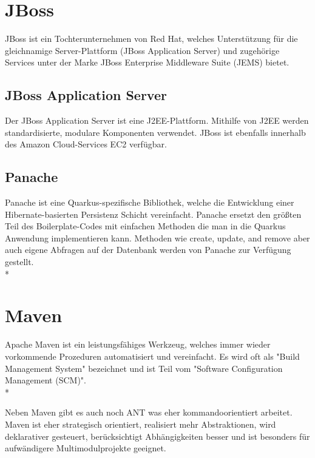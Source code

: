 \section{JBoss}
\author{David Ignjatovic}

JBoss ist ein Tochterunternehmen von Red Hat, welches Unterstützung für die gleichnamige Server-Plattform (JBoss Application Server) 
und zugehörige Services unter der Marke JBoss Enterprise Middleware Suite (JEMS) bietet. \cite{JBoss}

\subsection{JBoss Application Server}

Der JBoss Application Server ist eine J2EE-Plattform. Mithilfe von J2EE werden standardisierte, modulare Komponenten verwendet.
JBoss ist ebenfalls innerhalb des Amazon Cloud-Services EC2 verfügbar. \cite{JBoss}

\subsection{Panache}
\author{David Ignjatovic}

Panache ist eine Quarkus-spezifische Bibliothek, welche die Entwicklung einer Hibernate-basierten Persistenz Schicht vereinfacht. 
Panache ersetzt den größten Teil des Boilerplate-Codes mit einfachen Methoden die man in die Quarkus Anwendung implementieren kann. 
Methoden wie create, update, and remove aber auch eigene Abfragen auf der Datenbank werden von Panache zur Verfügung gestellt. \\* \cite{Panache}


\section{Maven}
\author{David Ignjatovic}

Apache Maven ist ein leistungsfähiges Werkzeug, welches immer wieder vorkommende Prozeduren automatisiert und vereinfacht. 
Es wird oft als "Build Management System" bezeichnet und ist Teil vom "Software Configuration Management (SCM)".  \\* \cite{Maven}

Neben Maven gibt es auch noch ANT was eher kommandoorientiert arbeitet. Maven ist eher strategisch orientiert, realisiert mehr Abstraktionen, wird deklarativer gesteuert, 
berücksichtigt Abhängigkeiten besser und ist besonders für aufwändigere Multimodulprojekte geeignet. \cite{Maven}

